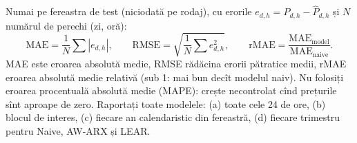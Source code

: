 %
{Numai pe fereastra de test (niciodată pe rodaj), cu erorile $e_{d,h}=P_{d,h}-\hat P_{d,h}$ și $N$ numărul de perechi (zi, oră):}
\begin{equation}
\text{MAE}=\frac1N\sum|e_{d,h}|,\qquad \text{RMSE}=\sqrt{\frac1N\sum e_{d,h}^2},\qquad \text{rMAE}=\frac{\text{MAE}_{\text{model}}}{\text{MAE}_{\text{naive}}}.
\end{equation}
%
{MAE este eroarea absolută medie, RMSE rădăcina erorii pătratice medii, rMAE eroarea absolută medie relativă \cite{Lago2021} (sub 1: mai bun decît modelul naiv).
Nu folosiți eroarea procentuală absolută medie (MAPE): crește necontrolat cînd prețurile sînt aproape de zero.
Raportați toate modelele: (a) toate cele 24 de ore, (b) blocul de interes, (c) fiecare an calendaristic din fereastră, (d) fiecare trimestru pentru Naive, AW-ARX și LEAR.}

